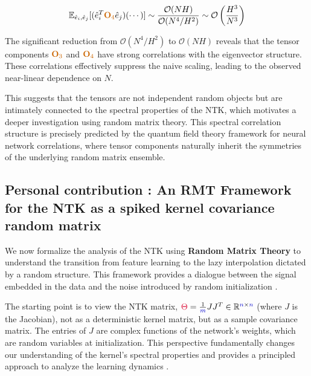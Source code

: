 \documentclass[a4paper]{article}
\theoremstyle{plain}
\theoremstyle{definition}
\theoremstyle{remark}
\begin{document}
\begin{equation}
\mathbb{E}_{\hat{e}_i, \hat{e}_j}[(\hat{e}_{i}^{T}\textcolor{orange!80!black}{\mathbf{O}_{4}}\hat{e}_{j})(\cdots)] \sim \frac{\mathcal{O}(NH)}{\mathcal{O}(N^4/H^2)} \sim \mathcal{O}\left(\frac{H^3}{N^3}\right) \label{eq:required_scaling}
\end{equation}

\begin{tcolorbox}[colback=green!10,colframe=green!60!black,title={\textbf{🎯 KEY FINDING: Eigenvector Correlations Matter}},enhanced,drop shadow]
The significant reduction from $\mathcal{O}(N^4/H^2)$ to $\mathcal{O}(NH)$ reveals that the tensor components $\textcolor{orange!80!black}{\mathbf{O}_3}$ and $\textcolor{orange!80!black}{\mathbf{O}_4}$ have strong correlations with the eigenvector structure. These correlations effectively suppress the naive scaling, leading to the observed near-linear dependence on $N$.

This suggests that the tensors are not independent random objects but are intimately connected to the spectral properties of the \textcolor{kernelcolor}{NTK}, which motivates a deeper investigation using random matrix theory. This spectral correlation structure is precisely predicted by the quantum field theory framework for neural network correlations, where tensor components naturally inherit the symmetries of the underlying random matrix ensemble.
\end{tcolorbox}




\subsection{Personal contribution : An RMT Framework for the NTK as a spiked kernel covariance random matrix}

\begin{tcolorbox}[colback=red!15,colframe=red!70!black,title={\textbf{🚀 BREAKTHROUGH: RMT Framework for NTK Analysis}},enhanced,drop shadow]
We now formalize the analysis of the \textcolor{kernelcolor}{NTK} using \textcolor{purple!80!black}{\textbf{Random Matrix Theory}} to understand the transition from feature learning to the lazy interpolation dictated by a random structure. This framework provides a dialogue between the signal embedded in the data and the noise introduced by random initialization \cite{doumeche2023sobolev_ntk}.
\end{tcolorbox}

The starting point is to view the \textcolor{kernelcolor}{NTK} matrix, $\textcolor{kernelcolor}{\Theta} = \frac{1}{\textcolor{blue!80!black}{m}}JJ^T \in \mathbb{R}^{\textcolor{blue!80!black}{n} \times \textcolor{blue!80!black}{n}}$ (where $J$ is the Jacobian), not as a deterministic kernel matrix, but as a sample covariance matrix. The entries of $J$ are complex functions of the network's weights, which are random variables at initialization. This perspective fundamentally changes our understanding of the kernel's spectral properties and provides a principled approach to analyze the learning dynamics \cite{townsend2022sobolev}.
\end{document}
